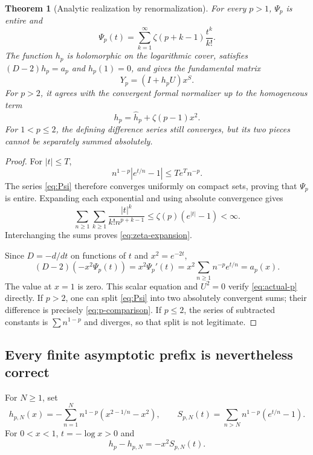 \documentclass[11pt,a4paper]{article}
\numberwithin{equation}{section}
\newtheorem{theorem}{Theorem}[section]
\theoremstyle{definition}
\theoremstyle{remark}
\begin{document}
\begin{theorem}[Analytic realization by renormalization]
\label{thm:renorm}
For every $p>1$, $\Psi_p$ is entire and
\begin{equation}\label{eq:zeta-expansion}
 \Psi_p(t)=\sum_{k=1}^{\infty}\zeta(p+k-1)\frac{t^k}{k!}.
\end{equation}
The function $h_p$ is holomorphic on the logarithmic cover, satisfies
$(D-2)h_p=a_p$ and $h_p(1)=0$, and gives the fundamental matrix
\begin{equation}\label{eq:actual-p}
 Y_p=(I+h_pU)x^S.
\end{equation}
For $p>2$, it agrees with the convergent formal normalizer up to the
homogeneous term
\begin{equation}\label{eq:p-comparison}
 h_p=\widehat h_p+\zeta(p-1)x^2.
\end{equation}
For $1<p\leq2$, the defining difference series still converges, but its
two pieces cannot be separately summed absolutely.
\end{theorem}
\begin{proof}
For $|t|\leq T$,
\[
 n^{1-p}|e^{t/n}-1|\leq T e^T n^{-p}.
\]
The series \eqref{eq:Psi} therefore converges uniformly on compact sets,
proving that $\Psi_p$ is entire. Expanding each exponential and using
absolute convergence gives
\[
 \sum_{n\geq1}\sum_{k\geq1}
   \frac{|t|^k}{k!n^{p+k-1}}
 \leq\zeta(p)(e^{|t|}-1)<\infty.
\]
Interchanging the sums proves \eqref{eq:zeta-expansion}.

Since $D=-d/dt$ on functions of $t$ and $x^2=e^{-2t}$,
\[
 (D-2)(-x^2\Psi_p(t))=x^2\Psi_p'(t)
   =x^2\sum_{n\geq1}n^{-p}e^{t/n}=a_p(x).
\]
The value at $x=1$ is zero. This scalar equation and $U^2=0$ verify
\eqref{eq:actual-p} directly. If $p>2$, one can split
\eqref{eq:Psi} into two absolutely convergent sums; their difference
is precisely \eqref{eq:p-comparison}. If $p\leq2$, the series of
subtracted constants is $\sum n^{1-p}$ and diverges, so that split is
not legitimate.
\end{proof}

\subsection{Every finite asymptotic prefix is nevertheless correct}
For $N\geq1$, set
\begin{equation}\label{eq:hN}
 h_{p,N}(x)=-\sum_{n=1}^{N}n^{1-p}(x^{2-1/n}-x^2),\qquad
 S_{p,N}(t)=\sum_{n>N}n^{1-p}(e^{t/n}-1).
\end{equation}
For $0<x<1$, $t=-\log x>0$ and
\begin{equation}\label{eq:error-exact}
 h_p-h_{p,N}=-x^2 S_{p,N}(t).
\end{equation}
\end{document}
